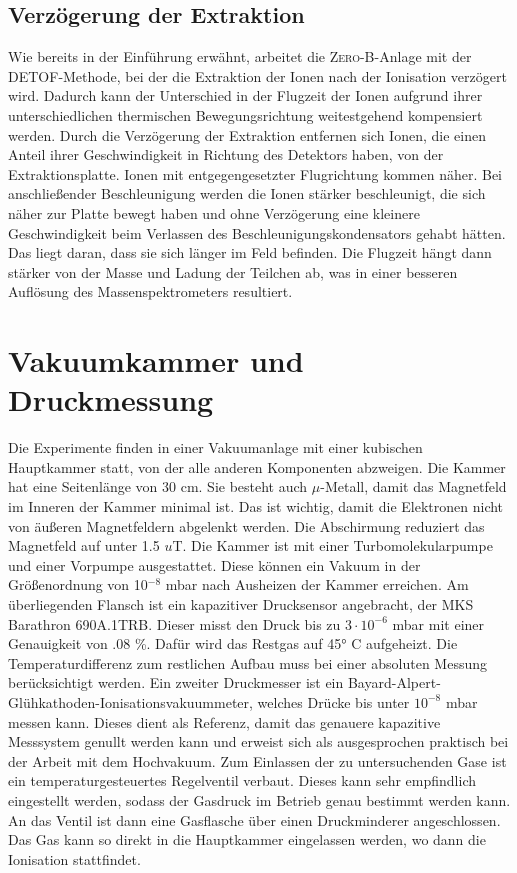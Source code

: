 \subsection{Verzögerung der Extraktion}
Wie bereits in der Einführung erwähnt, arbeitet die \textsc{Zero-B}-Anlage mit der \textsc{DETOF}-Methode, bei der die Extraktion der Ionen nach der Ionisation verzögert wird. Dadurch kann der Unterschied in der Flugzeit der Ionen aufgrund ihrer unterschiedlichen thermischen Bewegungsrichtung weitestgehend kompensiert werden. Durch die Verzögerung der Extraktion entfernen sich Ionen, die einen Anteil ihrer Geschwindigkeit in Richtung des Detektors haben, von der Extraktionsplatte. Ionen mit entgegengesetzter Flugrichtung kommen näher. Bei anschließender Beschleunigung werden die Ionen stärker beschleunigt, die sich näher zur Platte bewegt haben und ohne Verzögerung eine kleinere Geschwindigkeit beim Verlassen des Beschleunigungskondensators gehabt hätten. Das liegt daran, dass sie sich länger im Feld befinden. Die Flugzeit hängt dann stärker von der Masse und Ladung der Teilchen ab, was in einer besseren Auflösung des Massenspektrometers resultiert.

\section{Vakuumkammer und Druckmessung}
Die Experimente finden in einer Vakuumanlage mit einer kubischen Hauptkammer statt, von der alle anderen Komponenten abzweigen. Die Kammer hat eine Seitenlänge von 30 cm. Sie besteht auch $\mu$-Metall, damit das Magnetfeld im Inneren der Kammer minimal ist. Das ist wichtig, damit die Elektronen nicht von äußeren Magnetfeldern abgelenkt werden. Die Abschirmung reduziert das Magnetfeld auf unter 1.5 $u$T. Die Kammer ist mit einer Turbomolekularpumpe und einer Vorpumpe ausgestattet. Diese können ein Vakuum in der Größenordnung von 10$^{-8}$ mbar nach Ausheizen der Kammer erreichen. Am überliegenden Flansch ist ein kapazitiver Drucksensor angebracht, der MKS Barathron 690A.1TRB. Dieser misst den Druck bis zu $3 \cdot 10^{-6}$ mbar mit einer Genauigkeit von .08 \%. Dafür wird das Restgas auf \ang{45} C aufgeheizt. Die Temperaturdifferenz zum restlichen Aufbau muss bei einer absoluten Messung berücksichtigt werden. Ein zweiter Druckmesser ist ein Bayard-Alpert-Glühkathoden-Ionisationsvakuummeter, welches Drücke bis unter $10^{-8}$ mbar messen kann. Dieses dient als Referenz, damit das genauere kapazitive Messsystem genullt werden kann und erweist sich als ausgesprochen praktisch bei der Arbeit mit dem Hochvakuum.
Zum Einlassen der zu untersuchenden Gase ist ein temperaturgesteuertes Regelventil verbaut. Dieses kann sehr empfindlich eingestellt werden, sodass der Gasdruck im Betrieb genau bestimmt werden kann. An das Ventil ist dann eine Gasflasche über einen Druckminderer angeschlossen. Das Gas kann so direkt in die Hauptkammer eingelassen werden, wo dann die Ionisation stattfindet.

